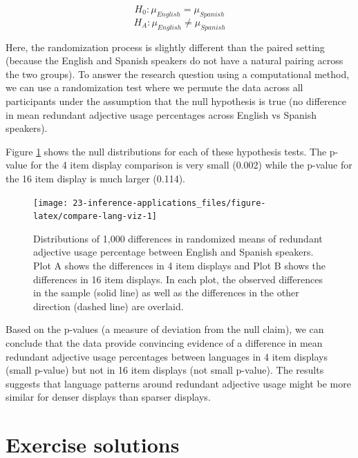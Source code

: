 \documentclass[
  10pt,
  openany]{book}
\begin{document}
\[H_0: \mu_{English} = \mu_{Spanish}\]
\[H_A: \mu_{English} \ne \mu_{Spanish}\]

Here, the randomization process is slightly different than the paired setting (because the English and Spanish speakers do not have a natural pairing across the two groups).
To answer the research question using a computational method, we can use a randomization test where we permute the data across all participants under the assumption that the null hypothesis is true (no difference in mean redundant adjective usage percentages across English vs Spanish speakers).

Figure \ref{fig:compare-lang-viz} shows the null distributions for each of these hypothesis tests.
The p-value for the 4 item display comparison is very small (0.002) while the p-value for the 16 item display is much larger (0.114).

\begin{figure}[h]

{\centering \texttt{[image: 23-inference-applications\_files/figure-latex/compare-lang-viz-1]} 

}

\caption{Distributions of 1,000 differences in randomized means of redundant adjective usage percentage between English and Spanish speakers. Plot A shows the differences in 4 item displays and Plot B shows the differences in 16 item displays. In each plot, the observed differences in the sample (solid line) as well as the differences in the other direction (dashed line) are overlaid.}\label{fig:compare-lang-viz}
\end{figure}

Based on the p-values (a measure of deviation from the null claim), we can conclude that the data provide convincing evidence of a difference in mean redundant adjective usage percentages between languages in 4 item displays (small p-value) but not in 16 item displays (not small p-value).
The results suggests that language patterns around redundant adjective usage might be more similar for denser displays than sparser displays.


\hypertarget{appendix-appendix}{%
\appendix}


\hypertarget{exercise-solutions}{%
\chapter{Exercise solutions}\label{exercise-solutions}}
\end{document}

